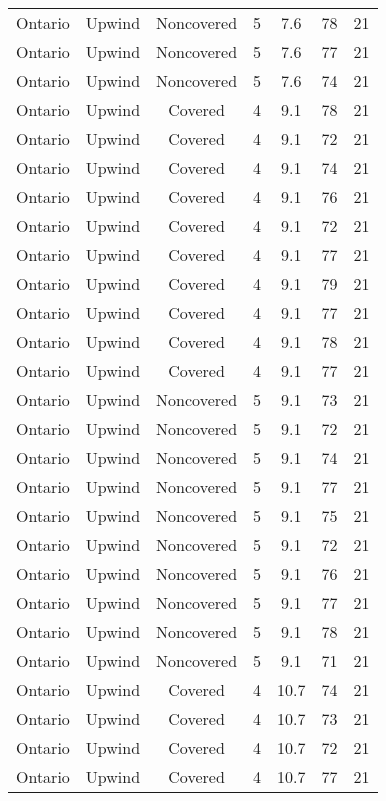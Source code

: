 \documentclass{article}
\begin{document}
\begin{longtable}[H]{ccccccc}
Ontario & Upwind   & Noncovered & 5 & 7.6  & 78  & 21 \\
Ontario & Upwind   & Noncovered & 5 & 7.6  & 77  & 21 \\
Ontario & Upwind   & Noncovered & 5 & 7.6  & 74  & 21 \\
Ontario & Upwind   & Covered     & 4 & 9.1  & 78  & 21 \\
Ontario & Upwind   & Covered     & 4 & 9.1  & 72  & 21 \\
Ontario & Upwind   & Covered     & 4 & 9.1  & 74  & 21 \\
Ontario & Upwind   & Covered     & 4 & 9.1  & 76  & 21 \\
Ontario & Upwind   & Covered     & 4 & 9.1  & 72  & 21 \\
Ontario & Upwind   & Covered     & 4 & 9.1  & 77  & 21 \\
Ontario & Upwind   & Covered     & 4 & 9.1  & 79  & 21 \\
Ontario & Upwind   & Covered     & 4 & 9.1  & 77  & 21 \\
Ontario & Upwind   & Covered     & 4 & 9.1  & 78  & 21 \\
Ontario & Upwind   & Covered     & 4 & 9.1  & 77  & 21 \\
Ontario & Upwind   & Noncovered & 5 & 9.1  & 73  & 21 \\
Ontario & Upwind   & Noncovered & 5 & 9.1  & 72  & 21 \\
Ontario & Upwind   & Noncovered & 5 & 9.1  & 74  & 21 \\
Ontario & Upwind   & Noncovered & 5 & 9.1  & 77  & 21 \\
Ontario & Upwind   & Noncovered & 5 & 9.1  & 75  & 21 \\
Ontario & Upwind   & Noncovered & 5 & 9.1  & 72  & 21 \\
Ontario & Upwind   & Noncovered & 5 & 9.1  & 76  & 21 \\
Ontario & Upwind   & Noncovered & 5 & 9.1  & 77  & 21 \\
Ontario & Upwind   & Noncovered & 5 & 9.1  & 78  & 21 \\
Ontario & Upwind   & Noncovered & 5 & 9.1  & 71  & 21 \\
Ontario & Upwind   & Covered     & 4 & 10.7 & 74  & 21 \\
Ontario & Upwind   & Covered     & 4 & 10.7 & 73  & 21 \\
Ontario & Upwind   & Covered     & 4 & 10.7 & 72  & 21 \\
Ontario & Upwind   & Covered     & 4 & 10.7 & 77  & 21 \\

\end{longtable}
\end{document}
